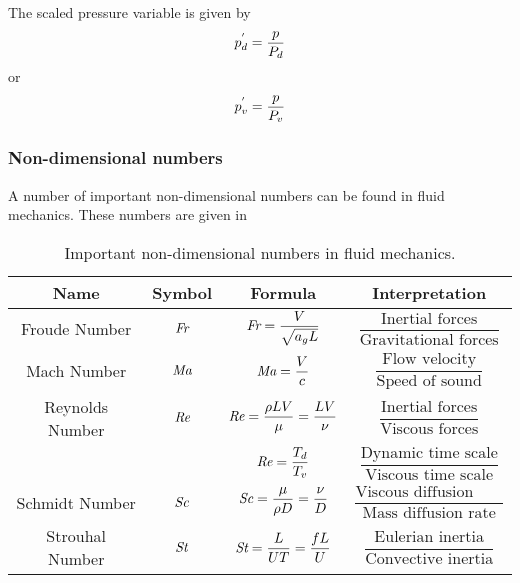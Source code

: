 The scaled pressure variable is given by
\begin{equation}
   {p}^{'} _{d}=\dfrac{p}{P_{d}}
\end{equation}
or
\begin{equation}
   {p}^{'} _{v}=\dfrac{p}{P_{v}}
\end{equation}

\subsubsection{Non-dimensional numbers}

A number of important non-dimensional numbers can be found in fluid mechanics. These numbers are given in 

\begin{table}[htb] \centering
  {\renewcommand{\arraystretch}{2.5}
  \begin{tabular}{|c|c|c|c|} \hline
    Name & Symbol & Formula & Interpretation \\ \hline\hline
    Froude Number & $  \textit{Fr}  $ & $  \textit{Fr}   = \dfrac{V}{\sqrt{a_{g}L}}$ &
    $\dfrac{\text{Inertial forces}}{\text{Gravitational forces}}$ \\ \hline
    Mach Number & $  \textit{Ma}  $ & $  \textit{Ma}   = \dfrac{V}{c}$ &
    $\dfrac{\text{Flow velocity}}{\text{Speed of sound}}$ \\ \hline
    Reynolds Number & $  \textit{Re}  $ & $  \textit{Re}   = \dfrac{\rho L V}{\mu} = \dfrac{L V}{\nu}$ &
    $\dfrac{\text{Inertial forces}}{\text{Viscous forces}}$ \\
    & & $  \textit{Re}   = \dfrac{T_{d}}{T_{v}}$ &
    $\dfrac{\text{Dynamic time scale}}{\text{Viscous time scale}}$ \\ \hline
    Schmidt Number & $  \textit{Sc}  $ & $  \textit{Sc}  =\dfrac{\mu}{\rho D}=\dfrac{\nu}{D}$ &
    $\dfrac{\text{Viscous diffusion rate}}{\text{Mass diffusion rate}}$ \\ \hline
    Strouhal Number & $  \textit{St}  $ & $  \textit{St}  =\dfrac{L}{U T}=\dfrac{f L}{U}$ &
    $\dfrac{\text{Eulerian inertia}}{\text{Convective inertia}}$ \\ \hline
  \end{tabular}}
  \caption{Important non-dimensional numbers in fluid mechanics.}
  \label{tab:NonDimensionalNumbersFluids}
\end{table}

